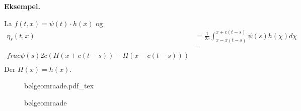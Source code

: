 \documentclass{article}
\newcommand{\incfig}[2][1]{%
\def\svgwidth{#1\columnwidth}
{#2.pdf_tex} } \pdfsuppresswarningpagegroup=1
\theoremstyle{remark}
\newcommand{\newpara}
  {
  \vskip 0.4cm
  }
\begin{document}
\textbf{Eksempel.} 

\newpara
La $f\left( t,x \right) = \psi \left( t \right) \cdot  h\left( x \right) $ og \[
  \begin{split}
\eta _{s} \left( t,x \right)  & = \frac{1}{2c} \int_{x - x\left( t-s \right)}^{ x + c \left( t-s \right)}  \psi \left( s \right) h\left( \chi  \right) d\chi   \\
 &=   \\frac{\psi \left( s \right)}{ 2c}  \left(  H\left( x + c\left( t-s \right) \right) - H\left( x - c\left( t -s \right) \right) \right) \\
  \end{split} 
\] 
Der $\dot{H} \left( x \right) = h\left( x \right)$. 

\begin{figure}[ht]
    \centering
    \incfig{bølgeomraade}
    \caption{bølgeomraade}
    \label{fig:bølgeomraade}
\end{figure}
\end{document}
